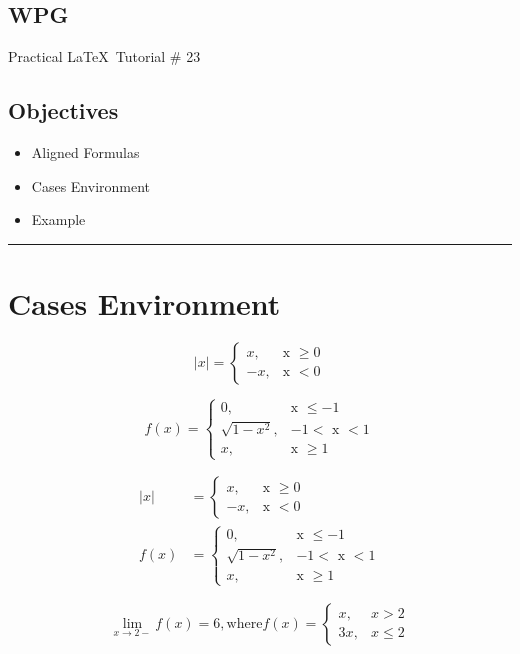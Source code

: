 \documentclass{article}
\begin{document}
	
	
	\begin{center}
		\section*{WPG}
		{\Large Practical \LaTeX\, Tutorial \# 23}
	\end{center}	
	\subsection*{Objectives}
	\begin{itemize}
		\item Aligned Formulas
		\item Cases Environment
		\item Example
	\end{itemize}
	\hrule
	\bigskip
	
	
	
	\section*{Cases Environment}
	
	$$
	\vert x \vert = \begin{cases}
			x, 			& \text{x $\ge 0$}\\
			-x, 		& \text{x $< 0$}
		\end{cases}
	$$
	
	$$
	f(x) = \begin{cases}
			0, 				& \text{x $\le -1$}\\
			\sqrt{1-x^2}, 	& \text{$-1 < $ x $< 1$}\\
			x,				& \text{x $\ge 1$}
		\end{cases}
	$$
	
	
	\begin{align*} 
		\vert x \vert &= \begin{cases}
			x, 			& \text{x $\ge 0$}\\
			-x, 		& \text{x $< 0$}
			\end{cases}\\	
		f(x) &= \begin{cases}
				0,		 		& \text{x $\le -1$}\\
				\sqrt{1-x^2}, 	& \text{$-1 < $ x $< 1$}\\
				x, 				& \text{x $\ge 1$}
			\end{cases}  
	\end{align*}
	
	

	$$
		\lim_{x\to 2-} f(x) = 6, \text{where} f(x) = \begin{cases}
										x, 			& \text{$x>2$}\\
										3x, 		& \text{$x \le 2$}
									\end{cases}
	$$
	
\end{document}
